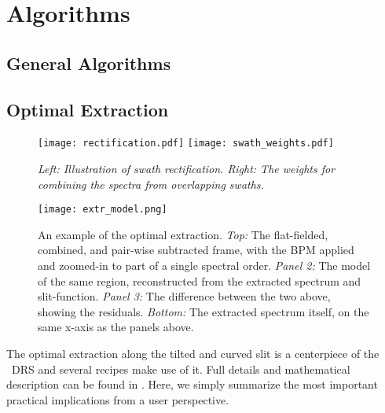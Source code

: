 \section{Algorithms}
\label{sec:algorithms}


\subsection{General Algorithms}
\label{sec:algorithms-general}

\subsection{Optimal Extraction}
\label{sec:extract}
\begin{figure}[ht]
    \begin{center}
\texttt{[image: rectification.pdf]}
\texttt{[image: swath\_weights.pdf]}
\end{center}
\caption{\it Left: Illustration of swath rectification. Right: The weights 
    for combining the spectra from overlapping swaths.}
\label{fig:swaths}
\end{figure}

\begin{figure}[ht]
    \begin{center}
\texttt{[image: extr\_model.png]}
\end{center}
\caption{An example of the optimal extraction. \emph{Top:} The flat-fielded,
combined, and pair-wise subtracted frame, with the BPM applied and zoomed-in to
part of a single spectral order. \emph{Panel 2:} The model of the same region,
reconstructed from the extracted spectrum and slit-function. \emph{Panel 3:} The
difference between the two above, showing the residuals. \emph{Bottom:} The
extracted spectrum itself, on the same x-axis as the panels above.}
\label{fig:extrmodel}
\end{figure}

The optimal extraction along the tilted and curved slit is a centerpiece of the
\instrument\ DRS and several recipes make use of it. Full details and
mathematical description can be found in \cite{2021A&A...646A..32P}. Here, we
simply summarize the most important practical implications from a user
perspective.

